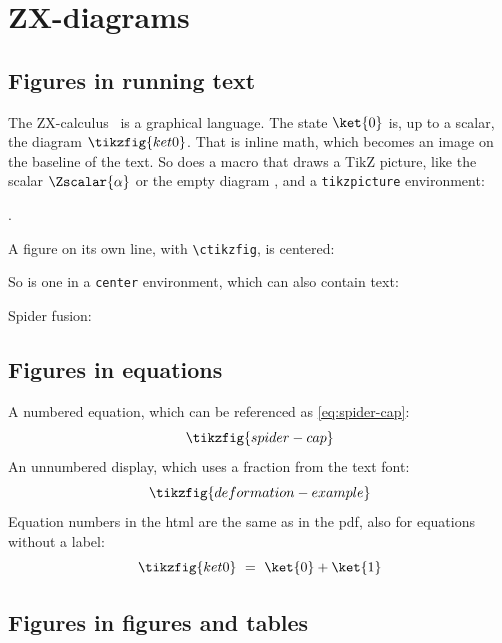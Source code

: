 \chapter{ZX-diagrams}\label{ch:diagrams}


\section{Figures in running text}

The ZX-calculus~\cite{CoeckeDuncan2011} is a graphical language. The state $\ket{0}$ is, up to a scalar, the
diagram $\tikzfig{ket0}$. That is inline math, which becomes an image on the baseline of the text. So does a
macro that draws a TikZ picture, like the scalar $\Zscalar{\alpha}$ or the empty diagram \emptydiag, and a
\texttt{tikzpicture} environment:
.

A figure on its own line, with \verb|\ctikzfig|, is centered:

So is one in a \texttt{center} environment, which can also contain text:
\begin{center}
  Spider fusion: \quad {}
\end{center}

\section{Figures in equations}

A numbered equation, which can be referenced as \eqref{eq:spider-cap}:
\begin{equation}\label{eq:spider-cap}
  \tikzfig{spider-cap}
\end{equation}
An unnumbered display, which uses a fraction from the text font:
\[
  \tikzfig{deformation-example}
\]
Equation numbers in the html are the same as in the pdf, also for equations without a label:
\begin{equation}
  \tikzfig{ket0} \ = \ \ket{0} + \ket{1}
\end{equation}

\section{Figures in figures and tables}

